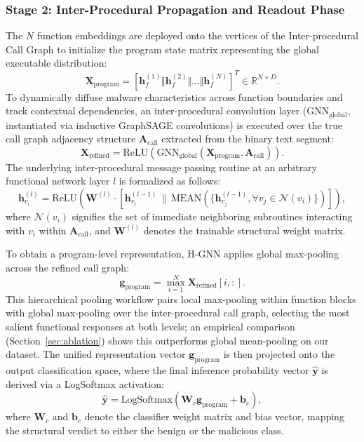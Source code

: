\documentclass{llncs}
\begin{document}
\subsubsection{Stage 2: Inter-Procedural Propagation and Readout Phase}
The $N$ function embeddings are deployed onto the vertices of the Inter-procedural Call Graph to initialize the program state matrix representing the global executable distribution:
\begin{equation}
\mathbf{X}_{\text{program}} = \left[ \mathbf{h}_{f}^{(1)} \Vert \mathbf{h}_{f}^{(2)} \Vert \dots \Vert \mathbf{h}_{f}^{(N)} \right]^{T} \in \mathbb{R}^{N \times D}.
\end{equation}
To dynamically diffuse malware characteristics across function boundaries and track contextual dependencies, an inter-procedural convolution layer ($\text{GNN}_{\text{global}}$, instantiated via inductive GraphSAGE convolutions) is executed over the true call graph adjacency structure $\mathbf{A}_{\text{call}}$ extracted from the binary text segment:
\begin{equation}
\mathbf{X}_{\text{refined}} = \mathrm{ReLU}\left( \text{GNN}_{\text{global}}(\mathbf{X}_{\text{program}}, \mathbf{A}_{\text{call}}) \right).
\end{equation}
The underlying inter-procedural message passing routine at an arbitrary functional network layer $l$ is formalized as follows:
\begin{equation}
\mathbf{h}_{v_i}^{(l)} = \text{ReLU} \left( \mathbf{W}^{(l)} \cdot \left[ \mathbf{h}_{v_i}^{(l-1)} \,\|\, \text{MEAN} \left( \{ \mathbf{h}_{v_j}^{(l-1)}, \forall v_j \in \mathcal{N}(v_i) \} \right) \right] \right),
\end{equation}
where $\mathcal{N}(v_i)$ signifies the set of immediate neighboring subroutines interacting with $v_i$ within $\mathbf{A}_{\text{call}}$, and $\mathbf{W}^{(l)}$ denotes the trainable structural weight matrix.

To obtain a program-level representation, H-GNN applies global max-pooling across the refined call graph:
\begin{equation}
\mathbf{g}_{\text{program}} = \operatorname*{max}_{i=1}^{N} \mathbf{X}_{\text{refined}}[i, :].
\end{equation}
This hierarchical pooling workflow pairs local max-pooling within function blocks with global max-pooling over the inter-procedural call graph, selecting the most salient functional responses at both levels; an empirical comparison (Section~\ref{sec:ablation}) shows this outperforms global mean-pooling on our dataset. The unified representation vector $\mathbf{g}_{\text{program}}$ is then projected onto the output classification space, where the final inference probability vector $\hat{\mathbf{y}}$ is derived via a LogSoftmax activation:
\begin{equation}
\hat{\mathbf{y}} = \mathrm{LogSoftmax}\left(\mathbf{W}_{c} \mathbf{g}_{\text{program}} + \mathbf{b}_{c}\right),
\end{equation}
where $\mathbf{W}_{c}$ and $\mathbf{b}_{c}$ denote the classifier weight matrix and bias vector, mapping the structural verdict to either the benign or the malicious class.
\end{document}
